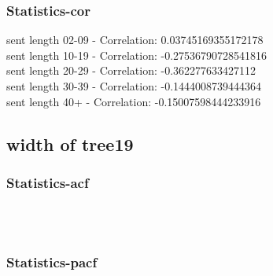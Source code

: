 \documentclass{article}%
\begin{document}
%
\newpage%
\subsubsection{Statistics{-}cor}%
\label{ssubsec:Statistics{-}cor}%
\noindent%
sent length 02-09 - Correlation: 0.03745169355172178\\%
sent length 10-19 - Correlation: -0.27536790728541816\\%
sent length 20-29 - Correlation: -0.362277633427112\\%
sent length 30-39 - Correlation: -0.1444008739444364\\%
sent length 40+ - Correlation: -0.15007598444233916\\

%
\newpage

%
\subsection{width of tree19}%
\label{subsec:widthoftree19}%
\subsubsection{Statistics{-}acf}%
\label{ssubsec:Statistics{-}acf}%


\begin{figure}[ht]%
\centering%
\setlength{\abovecaptionskip}{-35pt}%
%
%
\\%
%
%
\\%
%
\end{figure}

%
\newpage%
\subsubsection{Statistics{-}pacf}%
\label{ssubsec:Statistics{-}pacf}%
\end{document}
